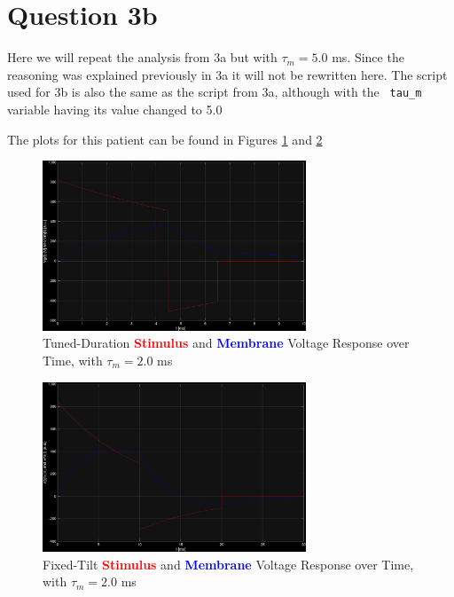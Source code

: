 \documentclass[]{report}
\begin{document}
\section*{Question 3b}

Here we will repeat the analysis from 3a but with $\tau_m = 5.0$ ms. Since the reasoning was explained previously in 3a it will not be rewritten here. The script used for 3b is also the same as the script from 3a, although with the \texttt{ tau\_m } variable having its value changed to 5.0

The plots for this patient can be found in Figures \ref{fig:5} and \ref{fig:6}

\begin{figure}[H]
	\centering
	\includegraphics[width=0.7\textwidth]{tau5ms_tuned_dur.png}
	\caption{\centering Tuned-Duration \textcolor{red}{\textbf{Stimulus}} and \textcolor{blue}{\textbf{Membrane}} Voltage Response over Time, with $\tau_m = 2.0$ ms}
	\label{fig:5}
\end{figure}

\begin{figure}[H]
	\centering
	\includegraphics[width=0.7\textwidth]{tau5ms_fixed_tilt.png}
	\caption{\centering Fixed-Tilt \textcolor{red}{\textbf{Stimulus}} and \textcolor{blue}{\textbf{Membrane}} Voltage Response over Time, with $\tau_m = 2.0$ ms}
	\label{fig:6}
\end{figure}
\end{document}
